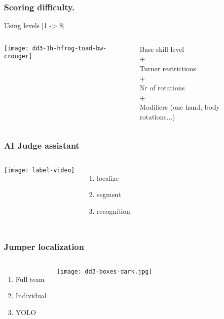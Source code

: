 \documentclass[aspectratio=169]{beamer}
\begin{document}
\begin{frame}
  \frametitle{Scoring difficulty.}
  \vspace{-0.3cm}
  Using levels [1 -> 8]
  \vspace{0.2cm}

  \begin{columns}[c]
  
    \hspace{0.2cm} \texttt{[image: dd3-1h-hfrog-toad-bw-crouger]}

    Base skill level \\
    + \\
    Turner restrictions \\
    + \\
    Nr of rotations \\
    + \\
    Modifiers (one hand, body rotations...)

  \end{columns}
\end{frame}

\begin{frame}
  \frametitle{AI Judge assistant}

  \begin{columns}[c]
  
    \texttt{[image: label-video]}

    \vspace{-1.0cm}
    \begin{enumerate}
      \item localize
      \item segment
      \item recognition
    \end{enumerate}

  \end{columns}
\end{frame}

\begin{frame}
  \frametitle{Jumper localization}

  \begin{columns}[c]
  
    \vspace{-1.0cm}
    \begin{enumerate}
      \item Full team
      \item Individual
      \item YOLO
    \end{enumerate}

    \texttt{[image: dd3-boxes-dark.jpg]}


  \end{columns}
\end{frame}
\end{document}
